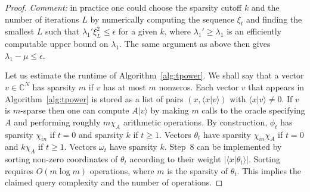 \documentclass[
  reprint,            %
  amsmath,amssymb,
  aps,
  superscriptaddress, %
  longbibliography
]{revtex4-2}
\theoremstyle{definition}
\newcommand{\CC}{\mathbb{C}}
\newcommand{\la}{\langle}
\newcommand{\ra}{\rangle}
\begin{document}
\begin{proof}
{\em Comment:} in practice one could choose the sparsity cutoff $k$ and the number of iterations $L$
by  numerically computing the sequence $\xi_t$
and finding the smallest $L$ such that $\lambda_1' \xi_L^2 \le\epsilon$
for a given $k$, where $\lambda_1'\ge \lambda_1$ is an efficiently computable
upper bound on $\lambda_1$.
 The same argument as above then gives $\lambda_1-\mu\le \epsilon$.


Let us estimate the runtime of Algorithm~\ref{alg:tpower}. We shall say that a vector $v\in \CC^N$ has sparsity $m$ if $v$ has at most $m$ nonzeros.
Each vector $v$ that appears in Algorithm~\ref{alg:tpower} is stored
as a list of pairs $(x,\la x|v\ra)$ with $\la x|v\ra\ne 0$. If $v$ is $m$-sparse then one can compute $A|v\ra$ by making  $m$ calls to the oracle specifying $A$
and performing roughly $m\chi_A$ arithmetic operations. By construction, $\phi_t$ has sparsity
$\chi_{in}$  if $t=0$ and sparsity $k$ if $t\ge 1$. Vectors $\theta_t$ have sparsity $\chi_{in} \chi_A$ if $t=0$ and $k \chi_A$ if $t\ge 1$.
Vectors $\omega_t$ have sparsity $k$.  Step~8 can be implemented by sorting non-zero coordinates
of $\theta_t$ according to their weight $|\la x|\theta_t\ra|$. Sorting requires $O(m\log{m})$ operations, where $m$ is the sparsity of $\theta_t$.
This implies the claimed query complexity and the number of operations.


\end{proof}
\end{document}
